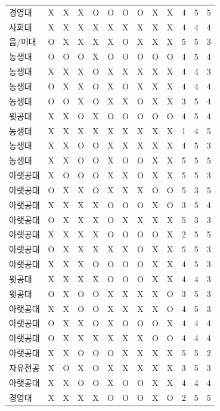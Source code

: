 \documentclass[11pt,a4paper]{article}
\begin{document}
\begin{center}
\begin{supertabular}{ | p{2cm} | x{0.5cm} | x{0.5cm} | x{0.5cm} | x{0.5cm} | x{0.5cm} | x{0.5cm} | x{0.5cm} | x{0.5cm} | x{0.5cm} | x{0.5cm} | x{0.5cm} | x{0.5cm} | }
경영대 & X & X & X & O & O & O & O & X & X & 4 & 5 & 5 \\
사회대 & X & X & X & X & X & X & X & X & X & 4 & 4 & 4 \\
음/미대 & O & X & X & X & X & O & X & X & X & 5 & 5 & 3 \\
농생대 & O & O & O & X & O & O & O & O & O & 4 & 5 & 4 \\
농생대 & X & X & X & O & X & X & X & X & X & 4 & 4 & 3 \\
농생대 & O & X & X & O & X & O & X & X & X & 4 & 4 & 4 \\
농생대 & O & O & X & O & X & X & O & X & X & 3 & 5 & 4 \\
윗공대 & X & X & O & X & O & O & O & O & O & 4 & 5 & 4 \\
농생대 & X & X & X & X & X & X & X & X & X & 1 & 4 & 5 \\
농생대 & X & X & O & O & X & X & X & X & X & 4 & 5 & 3 \\
농생대 & X & X & O & O & X & O & O & X & X & 5 & 5 & 5 \\
아랫공대 & X & O & O & O & X & X & O & X & X & 5 & 5 & 3 \\
아랫공대 & O & X & X & O & X & X & X & O & O & 5 & 3 & 5 \\
아랫공대 & X & X & X & X & O & O & O & X & O & 3 & 5 & 4 \\
아랫공대 & O & X & X & X & O & X & X & X & X & 5 & 3 & 3 \\
아랫공대 & X & X & X & X & O & O & O & O & X & 2 & 5 & 5 \\
아랫공대 & O & X & X & X & X & X & O & X & X & 5 & 5 & 3 \\
아랫공대 & X & X & X & O & O & O & O & X & X & 4 & 5 & 3 \\
윗공대 & X & X & X & X & O & O & O & X & X & 4 & 4 & 3 \\
윗공대 & O & X & O & O & X & X & X & X & O & 3 & 5 & 3 \\
아랫공대 & X & X & O & O & X & X & X & X & O & 4 & 5 & 3 \\
아랫공대 & O & X & X & O & X & O & O & O & X & 4 & 4 & 4 \\
아랫공대 & O & X & X & X & X & X & X & O & O & 4 & 4 & 4 \\
아랫공대 & X & X & O & O & O & X & X & X & X & 5 & 5 & 2 \\
자유전공 & X & O & X & O & X & X & X & X & X & 3 & 5 & 3 \\
아랫공대 & X & X & O & O & X & O & O & X & X & 4 & 4 & 4 \\
경영대 & X & X & X & X & O & O & O & X & O & 2 & 5 & 5 \\

\end{supertabular}
\end{center}
\end{document}
